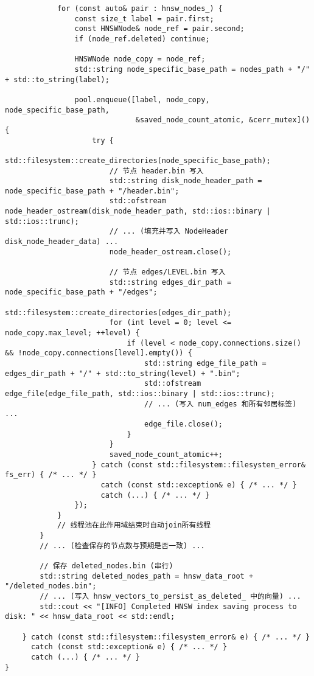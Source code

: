 \documentclass{ctexart} %
\begin{document}
\begin{verbatim}
            for (const auto& pair : hnsw_nodes_) {
                const size_t label = pair.first;
                const HNSWNode& node_ref = pair.second; 
                if (node_ref.deleted) continue;
                
                HNSWNode node_copy = node_ref; 
                std::string node_specific_base_path = nodes_path + "/" + std::to_string(label);

                pool.enqueue([label, node_copy, node_specific_base_path, 
                              &saved_node_count_atomic, &cerr_mutex]() {
                    try {
                        std::filesystem::create_directories(node_specific_base_path);
                        // 节点 header.bin 写入
                        std::string disk_node_header_path = node_specific_base_path + "/header.bin"; 
                        std::ofstream node_header_ostream(disk_node_header_path, std::ios::binary | std::ios::trunc); 
                        // ... (填充并写入 NodeHeader disk_node_header_data) ...
                        node_header_ostream.close();

                        // 节点 edges/LEVEL.bin 写入
                        std::string edges_dir_path = node_specific_base_path + "/edges";
                        std::filesystem::create_directories(edges_dir_path);
                        for (int level = 0; level <= node_copy.max_level; ++level) {
                            if (level < node_copy.connections.size() && !node_copy.connections[level].empty()) {
                                std::string edge_file_path = edges_dir_path + "/" + std::to_string(level) + ".bin";
                                std::ofstream edge_file(edge_file_path, std::ios::binary | std::ios::trunc);
                                // ... (写入 num_edges 和所有邻居标签) ...
                                edge_file.close();
                            }
                        }
                        saved_node_count_atomic++; 
                    } catch (const std::filesystem::filesystem_error& fs_err) { /* ... */ }
                      catch (const std::exception& e) { /* ... */ } 
                      catch (...) { /* ... */ }
                });
            }
            // 线程池在此作用域结束时自动join所有线程
        }
        // ... (检查保存的节点数与预期是否一致) ...

        // 保存 deleted_nodes.bin (串行)
        std::string deleted_nodes_path = hnsw_data_root + "/deleted_nodes.bin";
        // ... (写入 hnsw_vectors_to_persist_as_deleted_ 中的向量) ...
        std::cout << "[INFO] Completed HNSW index saving process to disk: " << hnsw_data_root << std::endl;

    } catch (const std::filesystem::filesystem_error& e) { /* ... */ }
      catch (const std::exception& e) { /* ... */ } 
      catch (...) { /* ... */ }
}
\end{verbatim}
\end{document}

